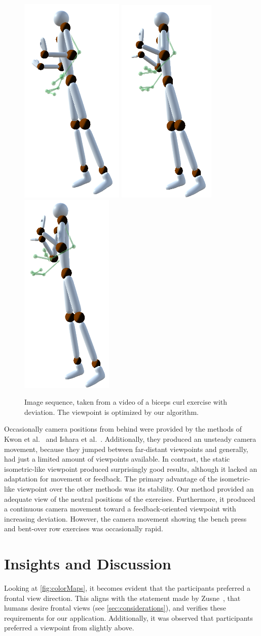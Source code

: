 \begin{figure}[h]
	\includegraphics[width=0.115\linewidth]{pictures/bicepsSequence6.png}\hfill
	\includegraphics[width=0.11\linewidth]{pictures/bicepsSequence7.png}\hfill
	\includegraphics[width=0.11\linewidth]{pictures/bicepsSequence8.png}\hfill
	\caption[Image sequence optimized by our method.]{Image sequence, taken from a video of a biceps curl exercise with deviation. The viewpoint is optimized by our algorithm.}
	\label{fig:bicepsSequence}
\end{figure}

Occasionally camera positions from behind were provided by the methods of Kwon et al.~\cite{kwon2020ocp} and Ishara et al.~\cite{ishara2015mra}. Additionally, they produced an unsteady camera movement, because they jumped between far-distant viewpoints and generally, had just a limited amount of viewpoints available. In contrast, the static isometric-like viewpoint produced surprisingly good results, although it lacked an adaptation for movement or feedback. The primary advantage of the isometric-like viewpoint over the other methods was its stability. Our method provided an adequate view of the neutral positions of the exercises. Furthermore, it produced a continuous camera movement toward a feedback-oriented viewpoint with increasing deviation. However, the camera movement showing the bench press and bent-over row exercises was occasionally rapid.

\section{Insights and Discussion\label{sec:insights}}
Looking at \autoref{fig:colorMaps}, it becomes evident that the participants preferred a frontal view direction. This aligns with the statement made by Zusne~\cite{zusne1970vpf}, that humans desire frontal views (see \autoref{sec:considerations}), and verifies these requirements for our application. Additionally, it was observed that participants preferred a viewpoint from slightly above.

